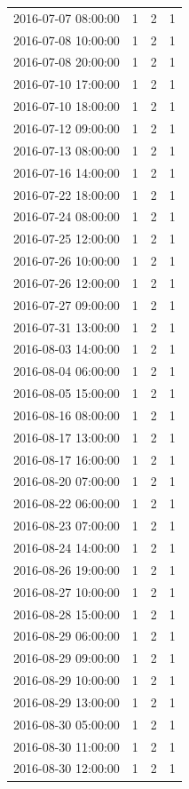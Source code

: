 \begin{tabular}{lrrr}
2016-07-07 08:00:00 & 1 & 2 & 1 \\
2016-07-08 10:00:00 & 1 & 2 & 1 \\
2016-07-08 20:00:00 & 1 & 2 & 1 \\
2016-07-10 17:00:00 & 1 & 2 & 1 \\
2016-07-10 18:00:00 & 1 & 2 & 1 \\
2016-07-12 09:00:00 & 1 & 2 & 1 \\
2016-07-13 08:00:00 & 1 & 2 & 1 \\
2016-07-16 14:00:00 & 1 & 2 & 1 \\
2016-07-22 18:00:00 & 1 & 2 & 1 \\
2016-07-24 08:00:00 & 1 & 2 & 1 \\
2016-07-25 12:00:00 & 1 & 2 & 1 \\
2016-07-26 10:00:00 & 1 & 2 & 1 \\
2016-07-26 12:00:00 & 1 & 2 & 1 \\
2016-07-27 09:00:00 & 1 & 2 & 1 \\
2016-07-31 13:00:00 & 1 & 2 & 1 \\
2016-08-03 14:00:00 & 1 & 2 & 1 \\
2016-08-04 06:00:00 & 1 & 2 & 1 \\
2016-08-05 15:00:00 & 1 & 2 & 1 \\
2016-08-16 08:00:00 & 1 & 2 & 1 \\
2016-08-17 13:00:00 & 1 & 2 & 1 \\
2016-08-17 16:00:00 & 1 & 2 & 1 \\
2016-08-20 07:00:00 & 1 & 2 & 1 \\
2016-08-22 06:00:00 & 1 & 2 & 1 \\
2016-08-23 07:00:00 & 1 & 2 & 1 \\
2016-08-24 14:00:00 & 1 & 2 & 1 \\
2016-08-26 19:00:00 & 1 & 2 & 1 \\
2016-08-27 10:00:00 & 1 & 2 & 1 \\
2016-08-28 15:00:00 & 1 & 2 & 1 \\
2016-08-29 06:00:00 & 1 & 2 & 1 \\
2016-08-29 09:00:00 & 1 & 2 & 1 \\
2016-08-29 10:00:00 & 1 & 2 & 1 \\
2016-08-29 13:00:00 & 1 & 2 & 1 \\
2016-08-30 05:00:00 & 1 & 2 & 1 \\
2016-08-30 11:00:00 & 1 & 2 & 1 \\
2016-08-30 12:00:00 & 1 & 2 & 1 \\

\end{tabular}

